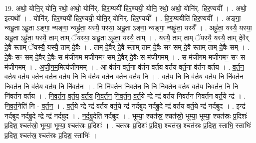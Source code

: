 \documentclass[17pt]{extarticle}
\begin{document}
19. अथो॒ योनि॒र् योनि॒ रथो॒ अथो॒ योनि॑र्. हिर॒ण्ययी॑ हिर॒ण्ययी॒ योनि॒ रथो॒ अथो॒ योनि॑र्. हिर॒ण्ययी᳚ । . अथो॒ इत्यथो᳚ । . योनि॑र्. हिर॒ण्ययी॑ हिर॒ण्ययी॒ योनि॒र् योनि॑र्. हिर॒ण्ययी᳚ । . हि॒र॒ण्ययीति॑ हिर॒ण्ययी᳚ । . अङ्गा॒ न्यह्रु॒ता ऽह्रु॒ता ऽङ्गा॒ न्यङ्गा॒ न्यह्रु॑ता॒ यस्यै॒ यस्या॒ अह्रु॒ता ऽङ्गा॒ न्यङ्गा॒ न्यह्रु॑ता॒ यस्यै᳚ । . अह्रु॑ता॒ यस्यै॒ यस्या॒ अह्रु॒ता ऽह्रु॑ता॒ यस्यै॒ ताम् ताम् ॅयस्या॒ अह्रु॒ता ऽह्रु॑ता॒ यस्यै॒ ताम् । . यस्यै॒ ताम् ताम् ॅयस्यै॒ यस्यै॒ ताम् दे॒वैर् दे॒वै स्ताम् ॅयस्यै॒ यस्यै॒ ताम् दे॒वैः । . ताम् दे॒वैर् दे॒वै स्ताम् ताम् दे॒वैः सꣳ सम् दे॒वै स्ताम् ताम् दे॒वैः सम् । . दे॒वैः सꣳ सम् दे॒वैर् दे॒वैः स म॑जीगम मजीगमꣳ॒॒ सम् दे॒वैर् दे॒वैः स म॑जीगमम् । . स म॑जीगम मजीगमꣳ॒॒ सꣳ स म॑जीगमम् । . अ॒जी॒ग॒म॒मित्य॑जीगमम् । . आ व॑र्तन वर्त॒ना व॑र्तन वर्तय वर्तय वर्त॒ना व॑र्तन वर्तय । . व॒र्त॒न॒ व॒र्त॒य॒ व॒र्त॒य॒ व॒र्त॒न॒ व॒र्त॒न॒ व॒र्त॒य॒ नि नि व॑र्तय वर्तन वर्तन वर्तय॒ नि । . व॒र्त॒य॒ नि नि व॑र्तय वर्तय॒ नि नि॑वर्तन निवर्तन॒ नि व॑र्तय वर्तय॒ नि नि॑वर्तन । . नि नि॑वर्तन निवर्तन॒ नि नि नि॑वर्तन वर्तय वर्तय निवर्तन॒ नि नि नि॑वर्तन वर्तय । . नि॒व॒र्त॒न॒ व॒र्त॒य॒ व॒र्त॒य॒ नि॒व॒र्त॒न॒ नि॒व॒र्त॒न॒ व॒र्त॒ये न्द्रे न्द्र॑ वर्तय निवर्तन निवर्तन वर्त॒ये न्द्र॑ । . नि॒व॒र्त॒नेति॑ नि - व॒र्त॒न॒ । . व॒र्त॒ये न्द्रे न्द्र॑ वर्तय वर्त॒ये न्द्र॑ नर्दबुद नर्दबु॒दे न्द्र॑ वर्तय वर्त॒ये न्द्र॑ नर्दबुद । . इन्द्र॑ नर्दबुद नर्दबु॒दे न्द्रे न्द्र॑ नर्दबुद । . न॒र्द॒बु॒देति॑ नर्दबुद । . भूम्या॒ श्चत॑स्र॒ श्चत॑स्रो॒ भूम्या॒ भूम्या॒ श्चत॑स्रः प्र॒दिशः॑ प्र॒दिश॒ श्चत॑स्रो॒ भूम्या॒ भूम्या॒ श्चत॑स्रः प्र॒दिशः॑ । . चत॑स्रः प्र॒दिशः॑ प्र॒दिश॒ श्चत॑स्र॒ श्चत॑स्रः प्र॒दिश॒ स्ताभि॒ स्ताभिः॑ प्र॒दिश॒ श्चत॑स्र॒ श्चत॑स्रः प्र॒दिश॒ स्ताभिः॑ । \newline
\end{document}
